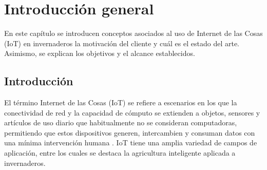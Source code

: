 \chapter{Introducción general} %

\label{Chapter1} %
\label{IntroGeneral}


\newcommand{\keyword}[1]{\textbf{#1}}
\newcommand{\tabhead}[1]{\textbf{#1}}
\newcommand{\code}[1]{\texttt{#1}}
\newcommand{\file}[1]{\texttt{\bfseries#1}}
\newcommand{\option}[1]{\texttt{\itshape#1}}
\newcommand{\grados}{$^{\circ}$}


En este capítulo se introducen conceptos asociados al uso de Internet de las Cosas (IoT) en invernaderos la motivación del cliente y cuál es el estado del arte. Asimismo, se explican los objetivos y el alcance establecidos.
\section{Introducción}
\label{Introducción}



El término Internet de las Cosas (IoT) se refiere a escenarios en los que la conectividad de red y la capacidad de cómputo se extienden a objetos, sensores y artículos de uso diario que habitualmente no se consideran computadoras, permitiendo que estos dispositivos generen, intercambien y consuman datos con una mínima intervención humana \citep{iotOverview}.
IoT tiene una amplia variedad de campos de aplicación, entre los cuales se destaca la agricultura inteligente aplicada a invernaderos.

